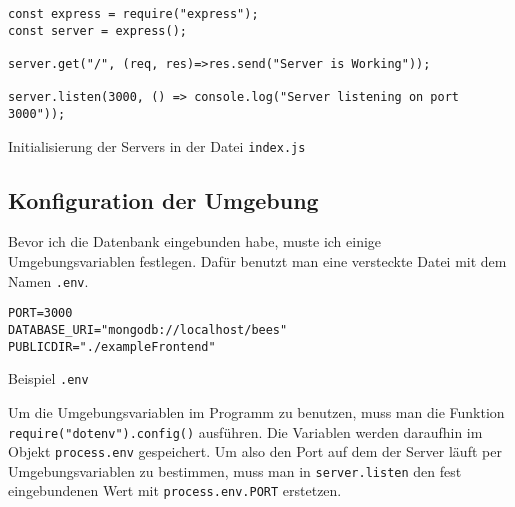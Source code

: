 \documentclass[a4paper, ngerman, 12pt]{scrartcl}
\newcommand{\js}[1]{\texttt{#1}}
\begin{document}
\begin{listing}[hb]
\centering
\begin{verbatim}
const express = require("express");
const server = express();

server.get("/", (req, res)=>res.send("Server is Working"));

server.listen(3000, () => console.log("Server listening on port 3000"));
\end{verbatim}
\caption{Initialisierung der Servers in der Datei \texttt{index.js}\label{lst:initserver}}
\end{listing}


\subsection{Konfiguration der Umgebung} %

Bevor ich die Datenbank eingebunden habe, muste ich einige Umgebungsvariablen festlegen.
Dafür benutzt man eine versteckte Datei mit dem Namen \texttt{.env}.
\begin{listing}[hb]
\centering	
\begin{verbatim}
PORT=3000
DATABASE_URI="mongodb://localhost/bees"
PUBLICDIR="./exampleFrontend"
\end{verbatim}
\caption{Beispiel \texttt{.env}}\label{lst:dotenv}
\end{listing}

Um die Umgebungsvariablen im Programm zu benutzen, muss man die Funktion \js{require("dotenv").config()} ausführen.
Die Variablen werden daraufhin im Objekt \js{process.env} gespeichert.
Um also den Port auf dem der Server läuft per Umgebungsvariablen zu bestimmen, muss man in \js{server.listen} den fest eingebundenen Wert mit \js{process.env.PORT} erstetzen.
\clearpage{}
\printbibliography{}
\end{document}
